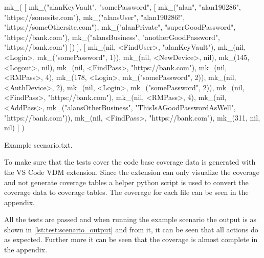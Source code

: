 \begin{listing}[H]
    \begin{vdm_al}
mk_(
    [
        mk_("alanKeyVault", "somePassword", [
            mk_("alan", "alan190286", "https://somesite.com"),
            mk_("alansUser", "alan190286!", "https://someOthersite.com"),
            mk_("alanPrivate", "superGoodPassword", "https://bank.com"),
            mk_("alansBusiness", "anotherGoodPassword", "https://bank.com")
        ])
    ],
    [
        mk_(nil, <FindUser>, "alanKeyVault"),
        mk_(nil, <Login>, mk_("somePassword", 1)),
        mk_(nil, <NewDevice>, nil),
        mk_(145, <Logout>, nil),
        mk_(nil, <FindPass>, "https://bank.com"),
        mk_(nil, <RMPass>, 4),
        mk_(178, <Login>, mk_("somePassword", 2)),
        mk_(nil, <AuthDevice>, 2),
        mk_(nil, <Login>, mk_("somePassword", 2)),
        mk_(nil, <FindPass>, "https://bank.com"),
        mk_(nil, <RMPass>, 4),
        mk_(nil, <AddPass>, mk_("alansOtherBusiness", 
                                "ThisIsAGoodPasswordAsWell", 
                                "https://bank.com")),
        mk_(nil, <FindPass>, "https://bank.com"),
        mk_(311, nil, nil)
    ]
)
    \end{vdm_al}
    \caption{Example {\ttfamily scenario.txt}.}
    \label{lst:test:scenario}
\end{listing}

To make sure that the tests cover the code base coverage data is generated with the VS Code VDM extension. Since the extension can only visualize the coverage and not generate coverage tables a helper python script is used to convert the coverage data to coverage tables. The coverage for each file can be seen in the appendix.

All the tests are passed and when running the example scenario the output is as shown in \cref{lst:test:scenario_output} and from it, it can be seen that all actions do as expected. Further more it can be seen that the coverage is almost complete in the appendix.

